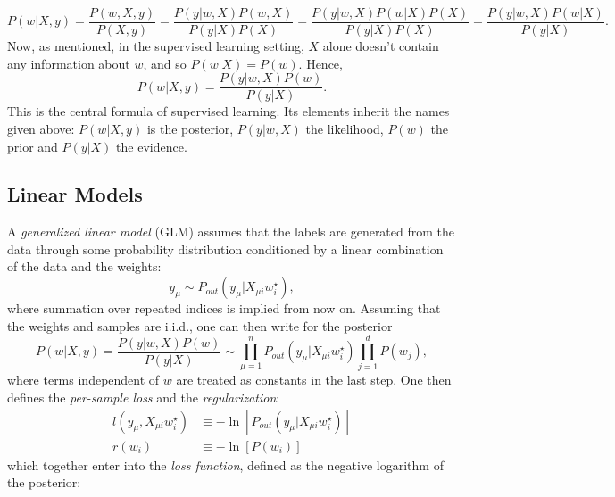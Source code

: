 \documentclass{article}
\begin{document}
\begin{equation}
    P(w | X,y) = \frac{P(w,X,y)}{P(X,y)}
    =
    \frac{P(y|w,X)P(w,X)}{P(y|X)P(X)}
    =
    \frac{P(y|w,X)P(w|X)P(X)}{P(y|X)P(X)}
    =
    \frac{P(y|w,X)P(w|X)}{P(y|X)}.
\end{equation}
Now, as mentioned, in the supervised learning setting, $X$ alone doesn't contain any information about $w$, and so $P(w|X) = P(w)$. Hence,
\begin{equation}
    P(w | X,y)
    =
    \frac{P(y|w,X)P(w)}{P(y|X)}.
    \label{eq:posterior}
\end{equation}
This is the central formula of supervised learning. Its elements inherit the names given above: $P(w | X,y)$ is the posterior, $P(y|w,X)$ the likelihood, $P(w)$ the prior and $P(y|X)$ the evidence. 

\subsection{Linear Models}
A \emph{generalized linear model} (GLM) assumes that the labels are generated from the data through some probability distribution conditioned by a linear combination of the data and the weights:
\begin{equation}
    y_{\mu} \sim P_{out} (y_{\mu} | X_{\mu i} w^{\star}_i),
\end{equation}
where summation over repeated indices is implied from now on. Assuming that the weights and samples are i.i.d., one can then write for the posterior
\begin{equation}
    P(w | X,y)
    =
    \frac{P(y | w,X) P(w)}{P(y|X)}
    \sim
    \prod_{\mu = 1}^{n} P_{out} (y_{\mu} | X_{\mu i} w^{\star}_i)
    \prod_{j = 1}^{d} P(w_j),
    \label{eq:linearposterior}
\end{equation}
where terms independent of $w$ are treated as constants in the last step. One then defines the \emph{per-sample loss} and the \emph{regularization}:
\begin{align}
    l(y_{\mu}, X_{\mu i} w^{\star}_i)
    &\equiv
    - \ln \left[P_{out} (y_{\mu} | X_{\mu i} w^{\star}_i)\right]\\
    r(w_i) &\equiv
    - \ln \left[P(w_i) \right]
\end{align}
which together enter into the \emph{loss function}, defined as the negative logarithm of the posterior:
\end{document}
